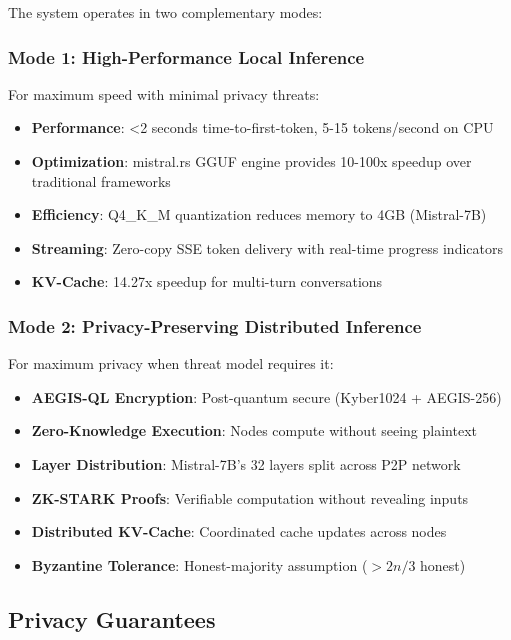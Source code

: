 \documentclass[11pt,a4paper]{article}
\begin{document}
The system operates in two complementary modes:

\subsubsection{Mode 1: High-Performance Local Inference}

For maximum speed with minimal privacy threats:
\begin{itemize}
    \item \textbf{Performance}: <2 seconds time-to-first-token, 5-15 tokens/second on CPU
    \item \textbf{Optimization}: mistral.rs GGUF engine provides 10-100x speedup over traditional frameworks
    \item \textbf{Efficiency}: Q4\_K\_M quantization reduces memory to 4GB (Mistral-7B)
    \item \textbf{Streaming}: Zero-copy SSE token delivery with real-time progress indicators
    \item \textbf{KV-Cache}: 14.27x speedup for multi-turn conversations
\end{itemize}

\subsubsection{Mode 2: Privacy-Preserving Distributed Inference}

For maximum privacy when threat model requires it:
\begin{itemize}
    \item \textbf{AEGIS-QL Encryption}: Post-quantum secure (Kyber1024 + AEGIS-256)
    \item \textbf{Zero-Knowledge Execution}: Nodes compute without seeing plaintext
    \item \textbf{Layer Distribution}: Mistral-7B's 32 layers split across P2P network
    \item \textbf{ZK-STARK Proofs}: Verifiable computation without revealing inputs
    \item \textbf{Distributed KV-Cache}: Coordinated cache updates across nodes
    \item \textbf{Byzantine Tolerance}: Honest-majority assumption ($>2n/3$ honest)
\end{itemize}

\subsection{Privacy Guarantees}
\end{document}
